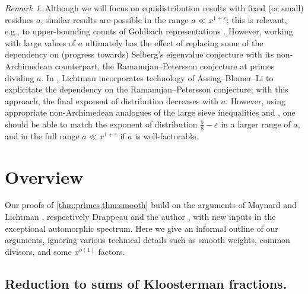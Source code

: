 \documentclass[reqno,11pt]{amsart}
\theoremstyle{remark}
\newtheorem*{remark}{Remark}
\numberwithin{equation}{section}
\newcommand{\eps}{\varepsilon}
\begin{document}
\begin{remark}
Although we will focus on equidistribution results with fixed (or small) residues $a$, similar results are possible in the range $a \ll x^{1+\eps}$; this is relevant, e.g., to upper-bounding counts of Goldbach representations \cite{lichtman2023primes}. However, working with large values of $a$ ultimately has the effect of replacing some of the dependency on (progress towards) Selberg's eigenvalue conjecture with its non-Archimedean counterpart, the Ramanujan--Petersson conjecture at primes dividing $a$. In \cite{lichtman2023primes}, Lichtman incorporates technology of Assing--Blomer--Li \cite{assing2021uniform} to explicitate the dependency on the Ramanujan--Petersson conjecture; with this approach, the final exponent of distribution decreases with $a$. However, using appropriate non-Archimedean analogues of the large sieve inequalities \cite[Theorem 3]{pascadi2024large} and \cite[Theorem 2]{watt1995kloosterman}, one should be able to match the exponent of distribution $\tfrac{5}{8}-\eps$ in a larger range of $a$, and in the full range $a \ll x^{1+\eps}$ if $a$ is well-factorable.
\end{remark}



\section{Overview} \label{sec:informal-overview}

Our proofs of \cref{thm:primes,thm:smooth} build on the arguments of Maynard \cite{maynard2025primes2} and Lichtman \cite{lichtman2023primes}, respectively Drappeau \cite{drappeau2015theoremes} and the author \cite{pascadi2023smooth}, with new inputs in the exceptional automorphic spectrum. Here we give an informal outline of our arguments, ignoring various technical details such as smooth weights, common divisors, and some $x^{o(1)}$ factors.

\subsection{Reduction to sums of Kloosterman fractions.}

\end{document}
